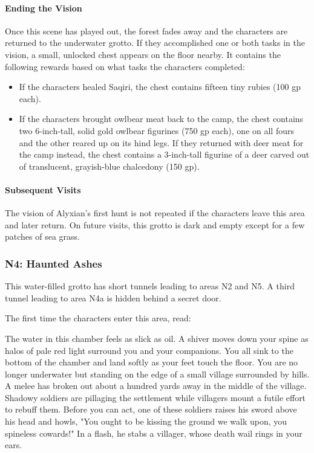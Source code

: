 \documentclass[a4paper, 11pt, bg=full, twocolumn, nooutline]{dndbook}
\begin{document}
\paragraph{Ending the Vision}

Once this scene has played out, the forest fades away and the characters are returned to the underwater grotto. If they accomplished one or both tasks in the vision, a small, unlocked chest appears on the floor nearby. It contains the following rewards based on what tasks the characters completed:

\begin{itemize}
\item If the characters healed Saqiri, the chest contains fifteen tiny rubies (100 gp each).
\item If the characters brought owlbear meat back to the camp, the chest contains two 6-inch-tall, solid gold owlbear figurines (750 gp each), one on all fours and the other reared up on its hind legs. If they returned with deer meat for the camp instead, the chest contains a 3-inch-tall figurine of a deer carved out of translucent, grayish-blue chalcedony (150 gp).
\end{itemize}

\paragraph{Subsequent Visits}

The vision of Alyxian's first hunt is not repeated if the characters leave this area and later return. On future visits, this grotto is dark and empty except for a few patches of sea grass.

\subsubsection{N4: Haunted Ashes}

This water-filled grotto has short tunnels leading to areas N2 and N5. A third tunnel leading to area N4a is hidden behind a secret door.

The first time the characters enter this area, read:

\begin{DndReadAloud}
The water in this chamber feels as slick as oil. A shiver moves down your spine as halos of pale red light surround you and your companions. You all sink to the bottom of the chamber and land softly as your feet touch the floor.
You are no longer underwater but standing on the edge of a small village surrounded by hills. A melee has broken out about a hundred yards away in the middle of the village. Shadowy soldiers are pillaging the settlement while villagers mount a futile effort to rebuff them. Before you can act, one of these soldiers raises his sword above his head and howls, "You ought to be kissing the ground we walk upon, you spineless cowards!" In a flash, he stabs a villager, whose death wail rings in your ears.
\end{DndReadAloud}
\end{document}
